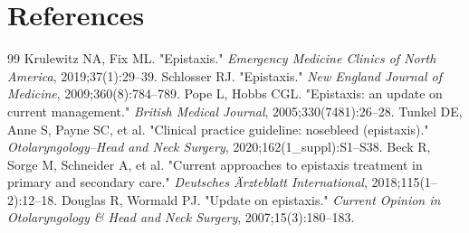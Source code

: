 \section*{References}
\begin{thebibliography}{99}
 Krulewitz NA, Fix ML. "Epistaxis." \textit{Emergency Medicine Clinics of North America}, 2019;37(1):29--39.
 Schlosser RJ. "Epistaxis." \textit{New England Journal of Medicine}, 2009;360(8):784--789.
 Pope L, Hobbs CGL. "Epistaxis: an update on current management." \textit{British Medical Journal}, 2005;330(7481):26--28.
 Tunkel DE, Anne S, Payne SC, et al. "Clinical practice guideline: nosebleed (epistaxis)." \textit{Otolaryngology--Head and Neck Surgery}, 2020;162(1\_suppl):S1--S38.
 Beck R, Sorge M, Schneider A, et al. "Current approaches to epistaxis treatment in primary and secondary care." \textit{Deutsches \"Arzteblatt International}, 2018;115(1--2):12--18.
 Douglas R, Wormald PJ. "Update on epistaxis." \textit{Current Opinion in Otolaryngology \& Head and Neck Surgery}, 2007;15(3):180--183.

\end{thebibliography}
